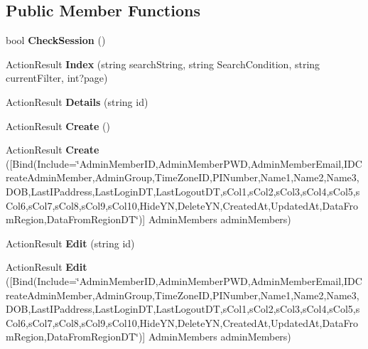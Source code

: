 \subsection*{Public Member Functions}
\begin{DoxyCompactItemize}
\item 
bool {\bfseries Check\+Session} ()\hypertarget{a00013_ae75a6a4a1a36411c3472a24683595d80}{}\label{a00013_ae75a6a4a1a36411c3472a24683595d80}

\item 
Action\+Result {\bfseries Index} (string search\+String, string Search\+Condition, string current\+Filter, int?page)\hypertarget{a00013_aa17b4dbe6d2d8cae0e1875e711ddd02d}{}\label{a00013_aa17b4dbe6d2d8cae0e1875e711ddd02d}

\item 
Action\+Result {\bfseries Details} (string id)\hypertarget{a00013_abbc6eef41402b780f53cd8c50711c436}{}\label{a00013_abbc6eef41402b780f53cd8c50711c436}

\item 
Action\+Result {\bfseries Create} ()\hypertarget{a00013_a894aac9cf428c68dfca57e60a22a1c53}{}\label{a00013_a894aac9cf428c68dfca57e60a22a1c53}

\item 
Action\+Result {\bfseries Create} (\mbox{[}Bind(Include=\char`\"{}Admin\+Member\+ID,Admin\+Member\+P\+WD,Admin\+Member\+Email,I\+D\+Create\+Admin\+Member,Admin\+Group,Time\+Zone\+ID,P\+I\+Number,Name1,Name2,Name3,D\+OB,Last\+I\+Paddress,Last\+Login\+DT,Last\+Logout\+DT,s\+Col1,s\+Col2,s\+Col3,s\+Col4,s\+Col5,s\+Col6,s\+Col7,s\+Col8,s\+Col9,s\+Col10,Hide\+YN,Delete\+YN,Created\+At,Updated\+At,Data\+From\+Region,Data\+From\+Region\+DT\char`\"{})\mbox{]} Admin\+Members admin\+Members)\hypertarget{a00013_aa025c3227fb7390b03bb0194f06a5ae9}{}\label{a00013_aa025c3227fb7390b03bb0194f06a5ae9}

\item 
Action\+Result {\bfseries Edit} (string id)\hypertarget{a00013_a6b5d0dd832c983f2d4cb72d9c00c0a85}{}\label{a00013_a6b5d0dd832c983f2d4cb72d9c00c0a85}

\item 
Action\+Result {\bfseries Edit} (\mbox{[}Bind(Include=\char`\"{}Admin\+Member\+ID,Admin\+Member\+P\+WD,Admin\+Member\+Email,I\+D\+Create\+Admin\+Member,Admin\+Group,Time\+Zone\+ID,P\+I\+Number,Name1,Name2,Name3,D\+OB,Last\+I\+Paddress,Last\+Login\+DT,Last\+Logout\+DT,s\+Col1,s\+Col2,s\+Col3,s\+Col4,s\+Col5,s\+Col6,s\+Col7,s\+Col8,s\+Col9,s\+Col10,Hide\+YN,Delete\+YN,Created\+At,Updated\+At,Data\+From\+Region,Data\+From\+Region\+DT\char`\"{})\mbox{]} Admin\+Members admin\+Members)\hypertarget{a00013_afadd578f1bb9f1ac39c8fdf194b7787f}{}\label{a00013_afadd578f1bb9f1ac39c8fdf194b7787f}


\end{DoxyCompactItemize}
